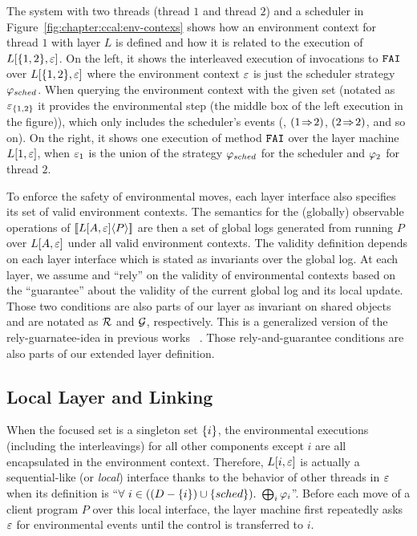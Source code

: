 The system with two threads
(thread $1$ and thread $2$) and a scheduler in Figure~\ref{fig:chapter:ccal:env-contexs}
shows how
an environment context for thread $1$  with layer $L$ is defined 
and how it is related to the execution of  $L[\{1,2\}, {\varepsilon}]$.
On the left, it shows the interleaved execution of
 invocations to ${\mathrm{\texttt{FAI}}}$ over $L[\{1, 2\}, {\varepsilon}]$
where the environment context ${\varepsilon}$ is just the scheduler
strategy $\varphi_{sched}$.
When querying the environment context with the given set (notated as ${\varepsilon}_{\{1, 2\}}$
it provides the environmental step (the middle box  of the left execution in the figure)),
which only includes the scheduler's events (\eg, $(1 \!\Rightarrow\! 2)$, $(2 \!\Rightarrow\! 2)$, and so on).
On the right, it shows one execution
of method ${\mathrm{\texttt{FAI}}}$ over the layer machine $L[1, {\varepsilon}]$, when ${\varepsilon}_1$ is the union of
the strategy $\varphi_{sched}$ for the scheduler and $\varphi_{2}$ for
thread $2$. 

To enforce the safety of environmental moves,
each layer interface also specifies its set of valid environment contexts.
The semantics for the (globally) observable operations of $[\![{L[A, {\varepsilon}]} \langle {P} \rangle]\!]$ are then a set of global logs
generated from running $P$ over $L[A, {\varepsilon}]$ under all valid
environment contexts. 
The validity definition depends on each layer interface which is stated as invariants over the global log. 
At each layer, we assume and ``rely''  on the validity of environmental contexts based on the ``guarantee'' about the validity of the current global log and its local update.
Those two conditions are also parts of our layer as invariant on shared objects and are notated as 
$\mathcal{R}$ and  $\mathcal{G}$, respectively.
This is a generalized version of the rely-guarnatee-idea in previous works ~\cite{feng07:sagl,vafeiadis:marriage,LRG,fu10:roch,sergey15}. 
Those rely-and-guarantee conditions
are also parts of our extended layer definition. 


\subsection{Local Layer and Linking}
\label{chapter:ccal:subsec:local-layer-with-environmental-context-and-local-layer-linking}
 
When the focused set is a singleton set $\{i\}$,
the environmental executions (including the interleavings) for all other components except $i$ are all encapsulated in the environment
context.
Therefore,  $L[i, {\varepsilon}]$ is actually a sequential-like (or \emph{local}) interface thanks to the behavior of other threads in ${\varepsilon}$ when
its definition is ``$\forall\ i \in ((D - \set{i}) \cup \set{sched}) .\ \bigoplus_{i} \strat{i}$''.
Before each move of a client program $P$ over this local interface, 
the layer machine first repeatedly asks ${\varepsilon}$ for environmental events until the control is transferred to $i$. 


